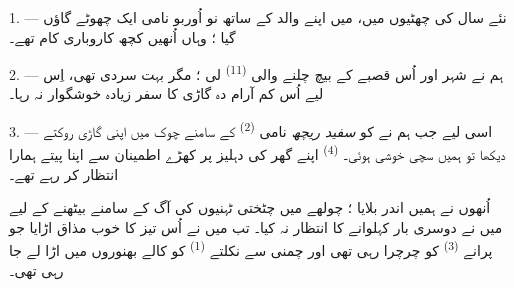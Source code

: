 %
%

\VUsaut{4.0mm}
\VUsaut{3.0mm}
\VUfilet{16mm}
\VUsaut{5.6mm}
\VUsaut{3.0mm}

\VUsaut{3.0mm}

\VUsaut{4.0mm}

1. --- نئے سال کی چھٹیوں میں، میں اپنے والد کے ساتھ نو اُوربو نامی
ایک چھوٹے گاؤں گیا ؛ وہاں اُنھیں کچھ کاروباری کام تھے۔

2. --- ہم نے شہر اور اُس قصبے کے بیچ چلنے والی 
\textsuperscript{(11)} لی ؛ مگر بہت سردی تھی، اِس لیے اُس کم آرام دہ
گاڑی کا سفر زیادہ خوشگوار نہ رہا۔

3. --- اسی لیے جب ہم نے  کو \textit{سفید ریچھ} نامی
 \textsuperscript{(2)} کے سامنے چوک میں اپنی گاڑی
روکتے دیکھا تو ہمیں سچی خوشی ہوئی۔ 
\textsuperscript{(4)} اپنے گھر کی دہلیز پر کھڑے اطمینان سے اپنا
 پیتے ہمارا انتظار کر رہے تھے۔

اُنھوں نے ہمیں اندر بلایا ؛ چولھے میں چٹختی ٹہنیوں کی آگ کے سامنے
بیٹھنے کے لیے میں نے دوسری بار کہلوانے کا انتظار نہ کیا۔ تب میں نے
اُس تیز  کا خوب مذاق اڑایا جو پرانے
 \textsuperscript{(3)} کو چرچرا رہی تھی اور چمنی سے
نکلتے  \textsuperscript{(1)} کو کالے بھنوروں میں اڑا
لے جا رہی تھی۔


